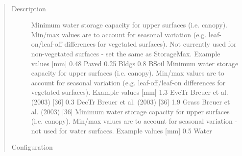 \documentclass[letterpaper,10pt,english]{sphinxmanual}
\begin{document}

\begin{fulllineitems}
\label{\detokenize{input_files/SUEWS_SiteInfo/Input_Options:cmdoption-arg-storagemin}}~\begin{quote}\begin{description}
\item[{Description}] \leavevmode
Minimum water storage capacity for upper surfaces (i.e. canopy). Min/max values are to account for seasonal variation (e.g. leaf-on/leaf-off differences for vegetated surfaces). Not currently used for non-vegetated surfaces - set the same as StorageMax. Example values {[}mm{]} 0.48 Paved 0.25 Bldgs 0.8 BSoil Minimum water storage capacity for upper surfaces (i.e. canopy). Min/max values are to account for seasonal variation (e.g. leaf-off/leaf-on differences for vegetated surfaces). Example values {[}mm{]} 1.3 EveTr Breuer et al. (2003) {[}36{]}  0.3 DecTr Breuer et al. (2003) {[}36{]}  1.9 Grass Breuer et al. (2003) {[}36{]}  Minimum water storage capacity for upper surfaces (i.e. canopy). Min/max values are to account for seasonal variation - not used for water surfaces. Example values {[}mm{]} 0.5 Water

\item[{Configuration}] \leavevmode


\end{description}
\end{quote}
\end{fulllineitems}
\end{document}
